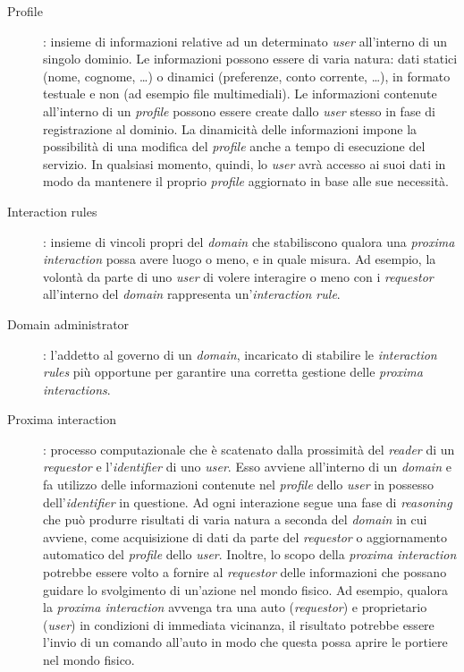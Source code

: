 \documentclass[a4paper,12pt]{report}
\begin{document}
\begin{description}
	\item[Profile] : insieme di informazioni relative ad un determinato \emph{user} all'interno di un singolo dominio. Le informazioni possono essere di varia natura: dati statici (nome, cognome, \dots) o dinamici (preferenze, conto corrente, \dots), in formato testuale e non (ad esempio file multimediali). Le informazioni contenute all'interno di un \emph{profile} possono essere create dallo \emph{user} stesso in fase di registrazione al dominio. La dinamicità delle informazioni impone la possibilità di una modifica del \emph{profile} anche a tempo di esecuzione del servizio. In qualsiasi momento, quindi, lo \emph{user} avrà accesso ai suoi dati in modo da mantenere il proprio \emph{profile} aggiornato in base alle sue necessità.
	\item[Interaction rules] : insieme di vincoli propri del \emph{domain} che stabiliscono qualora una \emph{proxima interaction} possa avere luogo o meno, e in quale misura. Ad esempio, la volontà da parte di uno \emph{user} di volere interagire o meno con i \emph{requestor} all'interno del \emph{domain} rappresenta un'\emph{interaction rule}.
	\item[Domain administrator] : l'addetto al governo di un \emph{domain}, incaricato di stabilire le \emph{interaction rules} più opportune per garantire una corretta gestione delle \emph{proxima interactions}.
	\item[Proxima interaction]: processo computazionale che è scatenato dalla prossimità del \emph{reader} di un \emph{requestor} e l'\emph{identifier} di uno \emph{user}. Esso avviene all'interno di un \emph{domain} e fa utilizzo delle informazioni contenute nel \emph{profile} dello \emph{user} in possesso dell'\emph{identifier} in questione. Ad ogni interazione segue una fase di \emph{reasoning} che può produrre risultati di varia natura a seconda del \emph{domain} in cui avviene, come acquisizione di dati da parte del \emph{requestor} o aggiornamento automatico del \emph{profile} dello \emph{user}. Inoltre, lo scopo della \emph{proxima interaction} potrebbe essere volto a fornire al \emph{requestor} delle informazioni che possano guidare lo svolgimento di un'azione nel mondo fisico. Ad esempio, qualora la \emph{proxima interaction} avvenga tra una auto (\emph{requestor}) e proprietario (\emph{user}) in condizioni di immediata vicinanza, il risultato potrebbe essere l'invio di un comando all'auto in modo che questa possa aprire le portiere nel mondo fisico.
\end{description}
\end{document}
